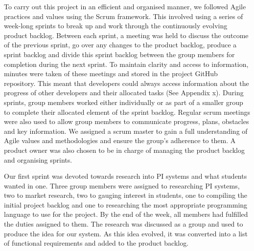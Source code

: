 \documentclass[12pt]{article}
\begin{document}
To carry out this project in an efficient and organised manner, we followed
Agile practices and values using the Scrum framework. This involved using a
series of week-long sprints to break up and work through the continuously
evolving product backlog. Between each sprint, a meeting was held to discuss
the outcome of the previous sprint, go over any changes to the product backlog,
produce a sprint backlog and divide this sprint backlog between the group
members for completion during the next sprint. To maintain clarity and access
to information, minutes were taken of these meetings and stored in the project
GitHub repository. This meant that developers could always access information
about the progress of other developers and their allocated tasks (See Appendix
x). During sprints, group members worked either individually or as part of a
smaller group to complete their allocated element of the sprint backlog.
Regular scrum meetings were also used to allow group members to communicate
progress, plans, obstacles and key information. We assigned a scrum master to
gain a full understanding of Agile values and methodologies and ensure the
group's adherence to them. A product owner was also chosen to be in charge of
managing the product backlog and organising sprints.\par

Our first sprint was devoted towards research into PI systems and what students
wanted in one. Three group members were assigned to researching PI systems, two
to market research, two to gauging interest in students, one to compiling the
initial project backlog and one to researching the most appropriate programming
language to use for the project. By the end of the week, all members had
fulfilled the duties assigned to them. The research was discussed as a group
and used to produce the idea for our system. As this idea evolved, it was
converted into a list of functional requirements and added to the product
backlog.\par
\end{document}
